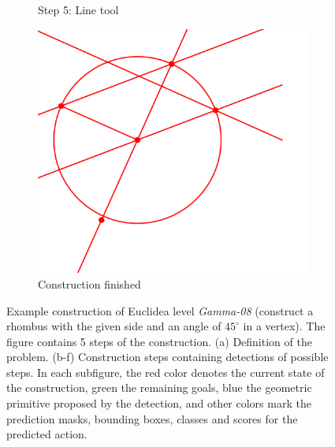 \begin{figure}[!htb]
\begin{subfigure}[t]{0.32\textwidth}
         \caption{Step 5: Line tool}
         \label{fig:Gamma08_example_step5}
     \end{subfigure}
     \hfill
     \begin{subfigure}[t]{0.32\textwidth}
         \centering
         \includegraphics[width=\textwidth]{img/Gamma-08_example/input_image5.png}
         \caption{Construction finished}
         \label{fig:Gamma08_example_step6}
     \end{subfigure}
     
        \caption{Example construction of Euclidea level \textit{Gamma-08} (construct a rhombus with the given side and an angle of $45^\circ$ in a vertex). The figure contains 5 steps of the construction. (a) Definition of the problem. (b-f) Construction steps containing \maskrcnn detections of possible steps. In each subfigure, the red color denotes the current state of the construction, green the remaining goals, blue the geometric primitive proposed by the detection,
        and other
        colors mark the prediction masks, bounding boxes, classes and scores for the predicted action.
        }
        \label{fig:Gamma08_example}
\end{figure}
\newpage
